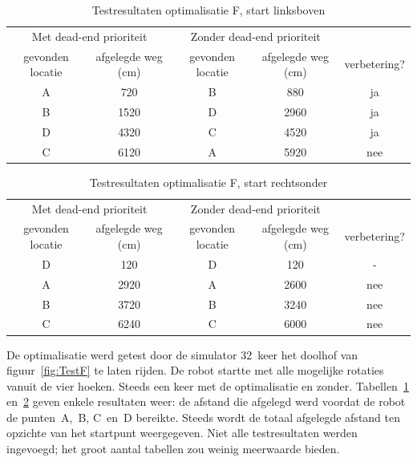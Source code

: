 \documentclass[tt2]{penoverslag}
\begin{document}
\begin{table}[!hb]
\begin{center}
    \begin{tabular}{ c | c || c | c || c}
   \multicolumn{2}{c||}{Met dead-end prioriteit} & \multicolumn{2}{|c||}{Zonder dead-end prioriteit} & \\
     gevonden locatie & afgelegde weg (cm) & gevonden locatie &  afgelegde weg (cm) & verbetering?\\ \hline\hline
    A & 720 & B & 880 & ja \\ \hline
    B & 1520 & D & 2960 & ja \\ \hline
    D & 4320 & C & 4520 & ja\\ \hline
    C & 6120 & A & 5920 & nee\\
    \end{tabular}
    \caption{Testresultaten optimalisatie F, start linksboven}
    \label{tab:resultVerken1}
\end{center}
\end{table}

\begin{table}[!hb]
\begin{center}
    \begin{tabular}{c | c || c | c || c}
   \multicolumn{2}{c||}{Met dead-end prioriteit} & \multicolumn{2}{|c}{Zonder dead-end prioriteit} &\\
     gevonden locatie &  afgelegde weg (cm) & gevonden locatie &  afgelegde weg (cm)& verbetering?\\ \hline\hline
    D & 120 & D & 120 & -\\ \hline
    A & 2920 & A & 2600 & nee\\ \hline
    B & 3720 & B & 3240 & nee\\ \hline
    C & 6240 & C & 6000 & nee\\
    \end{tabular}
    \caption{Testresultaten optimalisatie F, start rechtsonder}
    \label{tab:resultVerken2}
\end{center}
\end{table}

De optimalisatie werd getest door de simulator 32~keer het doolhof van figuur~\ref{fig:TestF} te laten rijden. De robot startte met alle mogelijke rotaties vanuit de vier hoeken. Steeds een keer met de optimalisatie en zonder. Tabellen~\ref{tab:resultVerken1} en~\ref{tab:resultVerken2} geven enkele resultaten weer: de afstand die afgelegd werd voordat de robot de punten~A,~B, C~en~D bereikte. Steeds wordt de totaal afgelegde afstand ten opzichte van het startpunt weergegeven. Niet alle testresultaten werden ingevoegd; het groot aantal tabellen zou weinig meerwaarde bieden.\\
\end{document}
